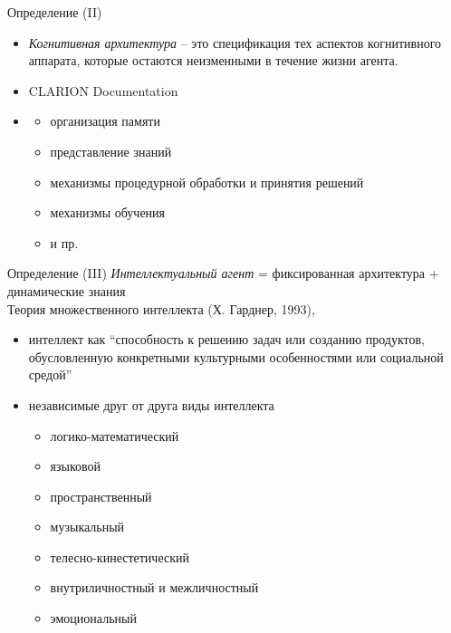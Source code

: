 \documentclass{beamer}
\begin{document}
\begin{frame}{Определение (II)}
\begin{itemize}
    \item[] \textit{Когнитивная архитектура} -- это спецификация тех аспектов когнитивного аппарата, которые остаются неизменными в течение жизни агента.
    \item[] \hfill CLARION Documentation
    \bigskip
    \item[]
        \begin{itemize}
            \item организация памяти
            \item представление знаний
            \item механизмы процедурной обработки и принятия решений
            \item механизмы обучения
            \item и пр.
        \end{itemize}
\end{itemize}
\end{frame}

\begin{frame}{Определение (III)}
\textit{Интеллектуальный агент} = фиксированная архитектура + динамические знания\\
\bigskip
Теория множественного интеллекта (Х. Гарднер, 1993), 
\begin{itemize}
    \item интеллект как ``способность к решению задач или созданию продуктов, обусловленную конкретными культурными особенностями или социальной средой''
    \medskip
    \item независимые друг от друга виды интеллекта
        \begin{itemize}
           \item логико-математический
           \item языковой
           \item пространственный
           \item музыкальный
           \item телесно-кинестетический
           \item внутриличностный и межличностный
           \item эмоциональный
        \end{itemize}
\end{itemize}
\end{frame}
\end{document}
